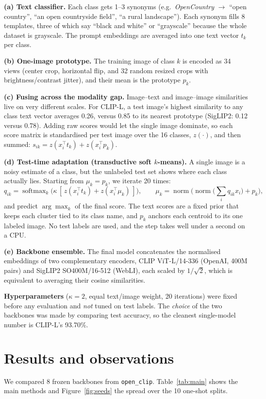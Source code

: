 \documentclass[10pt]{article}
\begin{document}
\textbf{(a) Text classifier.} Each class gets 1--3 synonyms (e.g.\ \emph{OpenCountry} $\to$ ``open country'', ``an open countryside field'', ``a rural landscape'').
Each synonym fills 8 templates, three of which say ``black and white'' or ``grayscale'' because the whole dataset is grayscale.
The prompt embeddings are averaged into one text vector $t_k$ per class.

\textbf{(b) One-image prototype.} The training image of class $k$ is encoded as 34 views (center crop, horizontal flip, and 32 random resized crops with brightness/contrast jitter), and their mean is the prototype $p_k$.

\textbf{(c) Fusing across the modality gap.} Image--text and image--image similarities live on very different scales.
For CLIP-L, a test image's highest similarity to any class text vector averages 0.26, versus 0.85 to its nearest prototype (SigLIP2: 0.12 versus 0.78).
Adding raw scores would let the single image dominate, so each score matrix is standardised per test image over the 16 classes, $z(\cdot)$, and then summed: $s_{ik}=z(x_i^\top t_k)+z(x_i^\top p_k)$.

\textbf{(d) Test-time adaptation (transductive soft $k$-means).} A single image is a noisy estimate of a class, but the unlabeled test set shows where each class actually lies.
Starting from $\mu_k=p_k$, we iterate 20 times:
\[
q_{ik}=\operatorname{softmax}_k\!\big(\kappa\,[\,z(x_i^\top t_k)+z(x_i^\top \mu_k)\,]\big),\qquad
\mu_k=\operatorname{norm}\!\Big(\operatorname{norm}\big(\textstyle\sum_i q_{ik}x_i\big)+p_k\Big),
\]
and predict $\arg\max_k$ of the final score.
The text scores are a fixed prior that keeps each cluster tied to its class name, and $p_k$ anchors each centroid to its one labeled image.
No test labels are used, and the step takes well under a second on a CPU.

\textbf{(e) Backbone ensemble.} The final model concatenates the normalised embeddings of two complementary encoders, CLIP ViT-L/14-336 (OpenAI, 400M pairs) and SigLIP2 SO400M/16-512 (WebLI), each scaled by $1/\sqrt{2}$, which is equivalent to averaging their cosine similarities.

\textbf{Hyperparameters} ($\kappa=2$, equal text/image weight, 20 iterations) were fixed before any evaluation and \emph{not} tuned on test labels.
The \emph{choice} of the two backbones was made by comparing test accuracy, so the cleanest single-model number is CLIP-L's 93.70\%.

\section{Results and observations}
We compared 8 frozen backbones from \texttt{open\_clip}.
Table~\ref{tab:main} shows the main methods and Figure~\ref{fig:seeds} the spread over the 10 one-shot splits.
\end{document}
